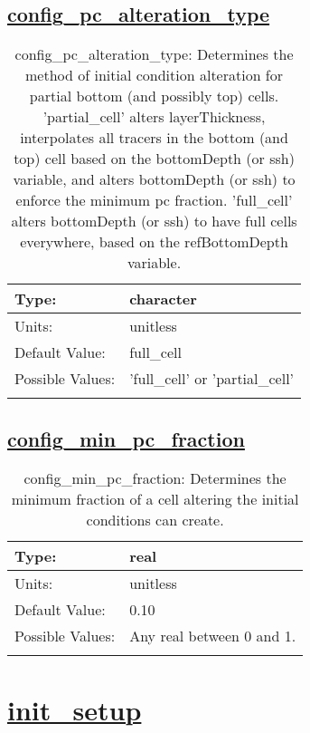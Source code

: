 \subsection[config\_pc\_alteration\_type]{\hyperref[sec:nm_tab_partial_cells]{config\_pc\_alteration\_type}}
\label{subsec:nm_sec_config_pc_alteration_type}
\begin{center}
\begin{longtable}{| p{2.0in} || p{4.0in} |}
    \hline
    Type: & character \\
    \hline
    Units: & \si{unitless} \\
    \hline
    Default Value: & full\_cell \\
    \hline
    Possible Values: & 'full\_cell' or 'partial\_cell' \\
    \hline
    \caption{config\_pc\_alteration\_type: Determines the method of initial condition alteration for partial bottom (and possibly top) cells. 'partial\_cell' alters layerThickness, interpolates all tracers in the bottom (and top) cell based on the bottomDepth (or ssh) variable, and alters bottomDepth (or ssh) to enforce the minimum pc fraction. 'full\_cell' alters bottomDepth (or ssh) to have full cells everywhere, based on the refBottomDepth variable.}
\end{longtable}
\end{center}
\subsection[config\_min\_pc\_fraction]{\hyperref[sec:nm_tab_partial_cells]{config\_min\_pc\_fraction}}
\label{subsec:nm_sec_config_min_pc_fraction}
\begin{center}
\begin{longtable}{| p{2.0in} || p{4.0in} |}
    \hline
    Type: & real \\
    \hline
    Units: & \si{unitless} \\
    \hline
    Default Value: & 0.10 \\
    \hline
    Possible Values: & Any real between 0 and 1. \\
    \hline
    \caption{config\_min\_pc\_fraction: Determines the minimum fraction of a cell altering the initial conditions can create.}
\end{longtable}
\end{center}
\section[init\_setup]{\hyperref[sec:nm_tab_init_setup]{init\_setup}}
\label{sec:nm_sec_init_setup}

